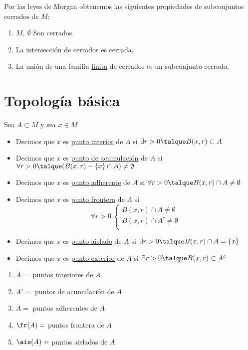 	\begin{corolario} Por las leyes de Morgan obtenemos las siguientes propiedades de subconjuntos cerrados de $M$:
 		\begin{enumerate}[1)]
			\item $M,\ \emptyset$ Son cerrados.
			\item La intersecci\'on de cerrados es cerrada.
			\item La uni\'on de una familia \underline{finita} de cerrados es un subconjunto cerrado.\\
	 	\end{enumerate}
 	\end{corolario}
 	
 	\section{Topología básica}
 	
 	\begin{defi} Sea $A\subset M$ y sea $x\in M$
		\begin{itemize}
			\item Decimos que $x$ es \underline{punto interior} de $A$ si $\exists r>0\talque B(x,r)\subset A$
			\item Decimos que $x$ es \underline{punto de acumulaci\'on} de $A$ si $\forall r>0\talque (B(x,r)-\{ x\}\cap A) \neq \emptyset$
			\item Decimos que $x$ es \underline{punto adherente} de $A$ si $\forall r>0\talque B(x,r)\cap A \neq \emptyset$
			\item Decimos que $x$ es \underline{punto frontera} de $A$ si \[\forall r>0\
\left\{
	      	\begin{array}{ll}
		 B(x,r)\cap A \neq \emptyset \\
		 B(x,r)\cap A^c \neq \emptyset \\
	       \end{array}
	     \right.\]
	    	\item Decimos que $x$ es \underline{punto aislado} de $A$ si $\exists r>0\talque B(x,r)\cap A = \{x\}$		
			\item Decimos que $x$ es \underline{punto exterior} de $A$ si $\exists r>0\talque B(x,r)\subset A^c$
		\end{itemize}
	
		\begin{enumerate}[-]
			\item $\mathring{A}=$ puntos interiores de $A$
			\item $A'=$ puntos de acumulaci\'on de $A$
			\item $\overline{A}=$ puntos adherentes de $A$
			\item $\fr(A)=$ puntos frontera de $A$
			\item $\ais(A)=$ puntos aislados de $A$
		\end{enumerate}
	\end{defi}	
	
